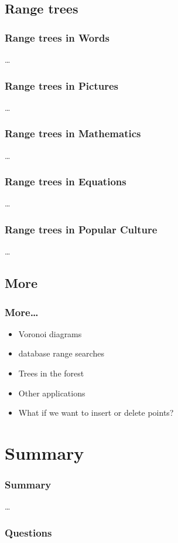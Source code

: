 \documentclass{beamer}
\begin{document}
\subsection{Range trees}

\begin{frame}
  \frametitle{Range trees in Words}
  \dots
\end{frame}

\begin{frame}
  \frametitle{Range trees in Pictures}
  \dots
\end{frame}

\begin{frame}
  \frametitle{Range trees in Mathematics}
  \dots
\end{frame}

\begin{frame}
  \frametitle{Range trees in Equations}
  \dots
\end{frame}

\begin{frame}
  \frametitle{Range trees in Popular Culture}
  \dots
\end{frame}

\subsection{More}

\begin{frame}
  \frametitle{More\dots}
  \begin{itemize}
  \item Voronoi diagrams
  \item database range searches
  \item Trees in the forest
  \item Other applications
  \item What if we want to insert or delete points?
  \end{itemize}
\end{frame}

\section*{Summary}

\begin{frame}
  \frametitle{Summary}  
  \dots
\end{frame}

\begin{frame}
  \frametitle{Questions}  
\end{frame}
\end{document}
